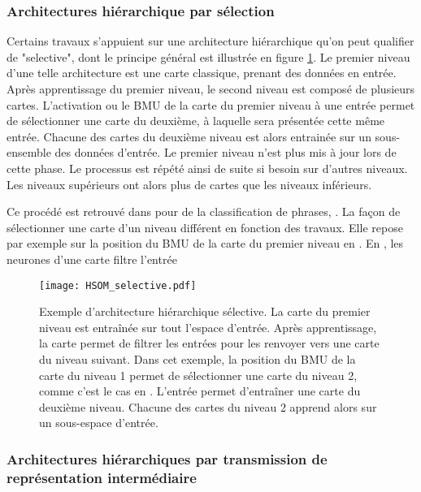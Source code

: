 \documentclass[../main]{subfiles}
\begin{document}
\subsubsection{Architectures hiérarchique par sélection}
Certains travaux s'appuient sur une architecture hiérarchique qu'on peut qualifier de "selective", dont le principe général est illustrée en figure \ref{fig:hsom_selective}.
Le premier niveau d'une telle architecture est une carte classique, prenant des données en entrée. Après apprentissage du premier niveau, le second niveau est composé de plusieurs cartes.
L'activation ou le BMU de la carte du premier niveau à une entrée permet de sélectionner une carte du deuxième, à laquelle sera présentée cette même entrée. 
Chacune des cartes du deuxième niveau est alors entrainée sur un sous-ensemble des données d'entrée. 
Le premier niveau n'est plus mis à jour lors de cette phase.
Le processus est répété ainsi de suite si besoin sur d'autres niveaux. Les niveaux supérieurs ont alors plus de cartes que les niveaux inférieurs.

Ce procédé est retrouvé dans \cite{barbalho_hierarchical_2001,suganthan_pattern_2001}
\cite{miikkulainen_script_1992} pour de la classification de phrases, \cite{dittenbach_growing_2000,ordonez_hierarchical_2010,zhao_stacked_2015}. 
La façon de sélectionner une carte d'un niveau différent en fonction des travaux.
Elle repose par exemple sur la position du BMU de la carte du premier niveau en \cite{barbalho_hierarchical_2001}. En \cite{??}, les neurones d'une carte 
\cite{zhao_stacked_2015} filtre l'entrée 

\begin{figure}
    \texttt{[image: HSOM\_selective.pdf]}
    \caption{Exemple d'architecture hiérarchique sélective. La carte du premier niveau est entraînée sur tout l'espace d'entrée. Après apprentissage, la carte permet de filtrer les entrées pour les renvoyer vers une carte du niveau suivant. Dans cet exemple, la position du BMU de la carte du niveau 1 permet de sélectionner une carte du niveau 2, comme c'est le cas en \cite{barbalho_hierarchical_2001}. 
    L'entrée permet d'entraîner une carte du deuxième niveau. Chacune des cartes du niveau 2 apprend alors sur un sous-espace d'entrée.\label{fig:hsom_selective}}
\end{figure}

\subsubsection{Architectures hiérarchiques par transmission de représentation intermédiaire}
\end{document}
